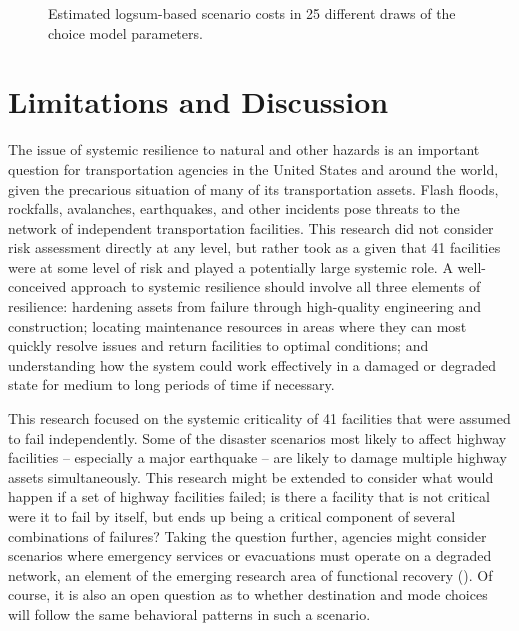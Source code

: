 \documentclass[]{ascelike-new}
\begin{document}
\begin{figure}


\caption{\label{fig-saplot}Estimated logsum-based scenario costs in 25
different draws of the choice model parameters.}

\end{figure}%


\section{Limitations and Discussion}\label{limitations-and-discussion}

The issue of systemic resilience to natural and other hazards is an
important question for transportation agencies in the United States and
around the world, given the precarious situation of many of its
transportation assets. Flash floods, rockfalls, avalanches, earthquakes,
and other incidents pose threats to the network of independent
transportation facilities. This research did not consider risk
assessment directly at any level, but rather took as a given that 41
facilities were at some level of risk and played a potentially large
systemic role. A well-conceived approach to systemic resilience should
involve all three elements of resilience: hardening assets from failure
through high-quality engineering and construction; locating maintenance
resources in areas where they can most quickly resolve issues and return
facilities to optimal conditions; and understanding how the system could
work effectively in a damaged or degraded state for medium to long
periods of time if necessary.

This research focused on the systemic criticality of 41 facilities that
were assumed to fail independently. Some of the disaster scenarios most
likely to affect highway facilities -- especially a major earthquake --
are likely to damage multiple highway assets simultaneously. This
research might be extended to consider what would happen if a set of
highway facilities failed; is there a facility that is not critical were
it to fail by itself, but ends up being a critical component of several
combinations of failures? Taking the question further, agencies might
consider scenarios where emergency services or evacuations must operate
on a degraded network, an element of the emerging research area of
functional recovery (). Of
course, it is also an open question as to whether destination and mode
choices will follow the same behavioral patterns in such a scenario.
\end{document}
